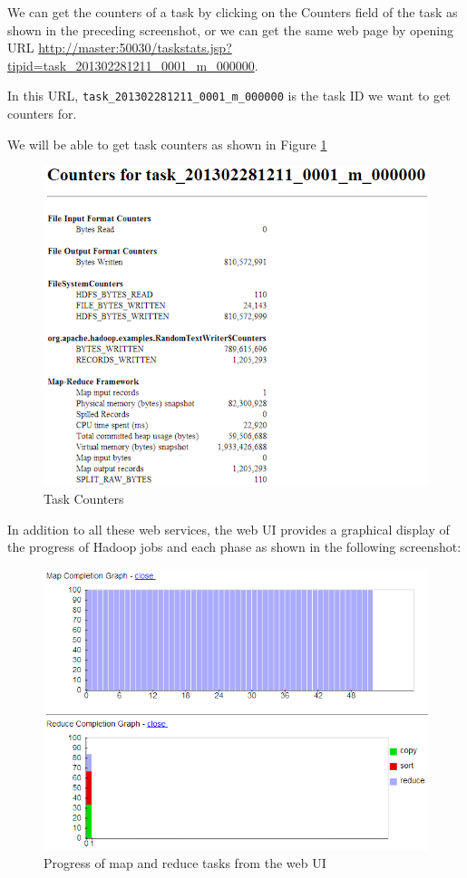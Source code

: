 We can get the counters of a task by clicking on the Counters field of the task as shown in the preceding screenshot, or we can get the same web page by opening URL \url{http://master:50030/taskstats.jsp?tipid=task_201302281211_0001_m_000000}.

In this URL, \verb|task_201302281211_0001_m_000000| is the task ID we want to get counters for.

We will be able to get task counters as shown in Figure \ref{fig:task.counters}
\begin{figure}[h]
  \centering
  \includegraphics[width=.8\textwidth]{figs/5163os_04_05.png}
  \caption{Task Counters}\label{fig:task.counters}
\end{figure} 

In addition to all these web services, the web UI provides a graphical display of the progress of Hadoop jobs and each phase as shown in the following screenshot: \\
\begin{figure}[h]
  \centering
  \includegraphics[width=.8\textwidth]{figs/5163os_04_06.png}
  \caption{Progress of map and reduce tasks from the web UI}\label{fig:mapreduce.progress}
\end{figure} 

